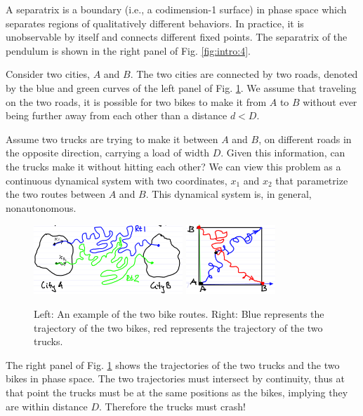 \begin{ex}[Pendulum]
\begin{figure}[H]
\end{figure}
\begin{definition}[Separatrix]
	A separatrix is a boundary (i.e., a codimension-1 surface) in phase space which separates regions of qualitatively different behaviors. In practice, it is unobservable by itself and connects different fixed points. The separatrix of the pendulum is shown in the right panel of Fig. \ref{fig:intro:4}. 
\end{definition}

\end{ex}

\begin{ex}
	Consider two cities, $A$ and $B$. The two cities are connected by two roads, denoted by the blue and green curves of the left panel of Fig. \ref{fig:intro:5}. We assume that traveling on the two roads, it is possible for two bikes to make it from $A$ to $B$ without ever being further away from each other than a distance $d<D$. 

	Assume two trucks are trying to make it between $A$ and $B$, on different roads in the opposite direction, carrying a load of width $D$. Given this information, can the trucks make it without hitting each other? We can view this problem as a continuous dynamical system with two coordinates, $x_1$ and $x_2$ that parametrize the two routes between $A$ and $B$. This dynamical system is, in general, nonautonomous. 
		\begin{figure}[H]
		\centering
		\includegraphics[width=0.5\textwidth]{figures/intro/7routes.png}
		\hspace{0.05\textwidth}
		\includegraphics[width=0.3\textwidth]{figures/intro/8truck_geometry.png}
		\caption{Left: An example of the two bike routes. Right: Blue represents the trajectory of the two bikes, red represents the trajectory of the two trucks.}
		\label{fig:intro:5}
	\end{figure}
	
The right panel of Fig. \ref{fig:intro:5} shows the trajectories of the two trucks  and the two bikes in phase space. 
The two trajectories must intersect by continuity, thus at that point the trucks must be at the same positions as the bikes, implying they are within distance $D$. Therefore the trucks must crash!	
\end{ex}


